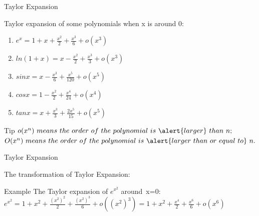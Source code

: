 \begin{frame}{Taylor Expansion}

	Taylor expansion of some polynomials when x is around 0:
	\begin{enumerate}
		\item $e^x=1+x+\frac{x^2}{2}+\frac{x^3}{6}+o(x^3)$
		\item $ln(1+x)=x-\frac{x^2}{2}+\frac{x^3}{3}+o(x^3)$
		\item $sinx=x-\frac{x^3}{6}+\frac{x^5}{120}+o(x^5)$
		\item $cosx=1-\frac{x^2}{2}+\frac{x^4}{24}+o(x^4)$
		\item $tanx=x+\frac{x^3}{3}+\frac{2x^5}{15}+o(x^5)$
	\end{enumerate}
	\begin{block}{Tip}
		\footnotesize
		$o(x^n)\ means\ the\ order\ of\ the\ polynomial\ is\ \alert{larger}\ than\ n;$\\
		$O(x^n)\ means\ the\ order\ of\ the\ polynomial\ is\ \alert{larger\ than\ or\ equal\ to}\ n.$
		\normalsize
	\end{block}
\end{frame}


\begin{frame}{Taylor Expansion}


	The transformation of Taylor Expansion:
	\begin{block}{Example}
		The Taylor expansion of $e^{x^2}$ around\ x=0:\\
		$e^{x^2}=1+x^2+\frac{(x^2)^2}{2}+\frac{(x^2)^3}{6}+o((x^2)^3)=1+x^2+\frac{x^4}{2}+\frac{x^6}{6}+o(x^6)$
	\end{block}


\end{frame}



